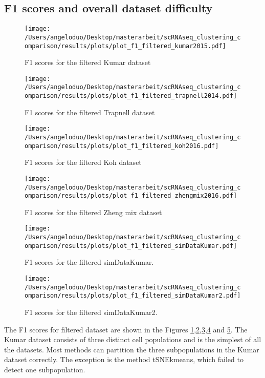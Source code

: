 \documentclass[12pt, a4paper]{article}\usepackage[]{graphicx}\usepackage[]{color}
\begin{document}
\subsection{F1 scores and overall dataset difficulty}
\begin{figure}[!h]
\texttt{[image: /Users/angeloduo/Desktop/masterarbeit/scRNAseq\_clustering\_comparison/results/plots/plot\_f1\_filtered\_kumar2015.pdf]}
\caption{F1 scores for the filtered Kumar dataset }
\label{fig:f1kumar}
\end{figure}

\begin{figure}[!h]
\texttt{[image: /Users/angeloduo/Desktop/masterarbeit/scRNAseq\_clustering\_comparison/results/plots/plot\_f1\_filtered\_trapnell2014.pdf]}
\caption{F1 scores for  the filtered Trapnell dataset }
\label{fig:f1trapnell}
\end{figure}

\begin{figure}[!h]
\texttt{[image: /Users/angeloduo/Desktop/masterarbeit/scRNAseq\_clustering\_comparison/results/plots/plot\_f1\_filtered\_koh2016.pdf]}
\caption{F1 scores for the filtered Koh dataset }
\label{fig:f1koh}
\end{figure}

\begin{figure}[!h]
\texttt{[image: /Users/angeloduo/Desktop/masterarbeit/scRNAseq\_clustering\_comparison/results/plots/plot\_f1\_filtered\_zhengmix2016.pdf]}
\caption{F1 scores for the filtered Zheng mix dataset }
\label{fig:f1zheng}
\end{figure}

\begin{figure}[!h]
\texttt{[image: /Users/angeloduo/Desktop/masterarbeit/scRNAseq\_clustering\_comparison/results/plots/plot\_f1\_filtered\_simDataKumar.pdf]}
\caption{F1 scores for the filtered simDataKumar. }
\label{fig:f1sim}
\end{figure}

\begin{figure}[!h]
\texttt{[image: /Users/angeloduo/Desktop/masterarbeit/scRNAseq\_clustering\_comparison/results/plots/plot\_f1\_filtered\_simDataKumar2.pdf]}
\caption{F1 scores for the filtered simDataKumar2. }
\label{fig:f1sim2}
\end{figure}

The F1 scores for filtered dataset are shown in the Figures \ref{fig:f1kumar},\ref{fig:f1trapnell},\ref{fig:f1koh},\ref{fig:f1zheng} and \ref{fig:f1sim}. The Kumar dataset consists of three distinct cell populations and is the simplest of all the datasets. Most methods can partition the three subpopulations in the Kumar dataset correctly. The exception is the method tSNEkmeans, which failed to detect one subpopulation. 
\end{document}
